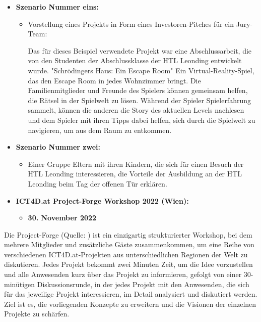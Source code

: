 \begin{itemize}
    \item \textbf{Szenario Nummer eins: }
    \begin{itemize}
        \item {Vorstellung eines Projekts in Form eines Investoren-Pitches für ein Jury-Team: 
        
        Das für dieses Beispiel verwendete Projekt war eine Abschlussarbeit, die von den Studenten der Abschlussklasse der HTL Leonding entwickelt wurde. "Schrödingers Haus: Ein Escape Room" Ein Virtual-Reality-Spiel, das den Escape Room in jedes Wohnzimmer bringt. Die Familienmitglieder und Freunde des Spielers können gemeinsam helfen, die Rätsel in der Spielwelt zu lösen. Während der Spieler Spielerfahrung sammelt, können die anderen die Story des aktuellen Levels nachlesen und dem Spieler mit ihren Tipps dabei helfen, sich durch die Spielwelt zu navigieren, um aus dem Raum zu entkommen.}
    \end{itemize}
    \item \textbf{Szenario Nummer zwei: }
    \begin{itemize}
        \item {Einer Gruppe Eltern mit ihren Kindern, die sich für einen Besuch der HTL Leonding interessieren, die Vorteile der Ausbildung an der HTL Leonding beim Tag der offenen Tür erklären.}
    \end{itemize}
\end{itemize}

\begin{itemize}
    \item \textbf{ICT4D.at Project-Forge Workshop 2022 (Wien):}
    \begin{itemize}
        \item \textbf{30. November 2022}
    \end{itemize}
\end{itemize}


Die Project-Forge (Quelle: ) ist ein einzigartig strukturierter Workshop, bei dem mehrere Mitglieder und zusätzliche Gäste zusammenkommen, um eine Reihe von verschiedenen ICT4D.at-Projekten aus unterschiedlichen Regionen der Welt zu diskutieren. Jedes Projekt bekommt zwei Minuten Zeit, um die Idee vorzustellen und alle Anwesenden kurz über das Projekt zu informieren, gefolgt von einer 30-minütigen Diskussionsrunde, in der jedes Projekt mit den Anwesenden, die sich für das jeweilige Projekt interessieren, im Detail analysiert und diskutiert werden. Ziel ist es, die vorliegenden Konzepte zu erweitern und die Visionen der einzelnen Projekte zu schärfen. 

